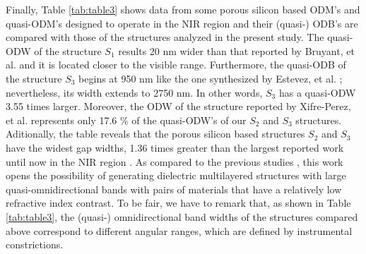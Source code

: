 \documentclass[a4paper,fleqn]{cas-sc}
\newcommand{\hl}[1]{{\color{blue}#1}}
\begin{document}
Finally, Table \ref{tab:table3} shows data from some porous
silicon based ODM's \hl{and quasi-ODM's designed to operate in the NIR
region and their (quasi-) ODB's are compared with those of
the structures analyzed in the present study. The quasi-ODW}
of the structure $S_1$ results 20 nm wider than that reported by Bruyant,
et al. \cite{Bruyant2003} and it is located closer to the visible range. Furthermore,
\hl{the quasi-ODB of the structure $S_3$} begins at 950 nm like the one
synthesized by Estevez, et al. \cite{Estevez2009}; nevertheless, its width extends to 2750
nm. In other words, $S_3$ has a quasi-ODW 3.55 times larger. Moreover, the
ODW of the structure reported by Xifre-Perez, et al. \cite{Xifre2005} represents only 17.6
\% of the \hl{quasi-ODW's of our $S_2$ and $S_3$ structures}. Aditionally, the table
reveals that the porous silicon based
structures $S_2$ and $S_3$ have the widest gap widths, 1.36 times greater than the
largest reported work until now in the NIR region \cite{Wu2021}.
As compared to the previous studies
\cite{Bruyant2003,Estevez2009,Xifre2005,Wu2021,Fink1998}, this work
opens the possibility of generating dielectric multilayered
\hl{structures with large quasi-omnidirectional bands with pairs of
materials that have a relatively low refractive index contrast. To be
fair, we have to remark that, as shown in Table \ref{tab:table3}, the
(quasi-) omnidirectional band widths of the structures compared above
correspond to different angular ranges,
which are defined by instrumental constrictions.}
\end{document}
